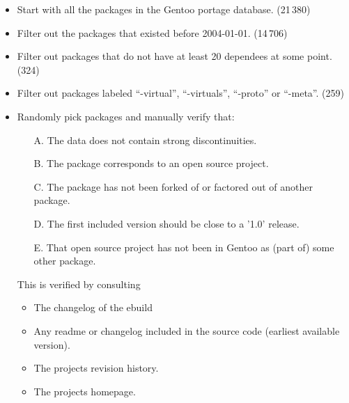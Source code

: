 \documentclass[smallextended,final]{svjour3}
\begin{document}
\begin{itemize}
	\item Start with all the packages in the Gentoo portage database. (21\,380)
	\item Filter out the packages that existed before 2004-01-01. (14\,706)
	\item Filter out packages that do not have at least 20 dependees at some point. (324)
	\item Filter out packages labeled “-virtual”, “-virtuals”, “-proto” or “-meta”. (259)
	\item Randomly pick packages and manually verify that:
	\begin{enumerate}
		\item[A.] The data does not contain strong discontinuities.
		\item[B.] The package corresponds to an open source project.
		\item[C.] The package has not been forked of or factored out of another package.
		\item[D.] The first included version should be close to a '1.0' release.
		\item[E.] That open source project has not been in Gentoo as (part of) some other package.
	\end{enumerate}
	This is verified by consulting
	\begin{itemize}
		\item The changelog of the ebuild
		\item Any readme or changelog included in the source code (earliest available version).
		\item The projects revision history.
		\item The projects homepage.
	\end{itemize}
\end{itemize}
\end{document}

